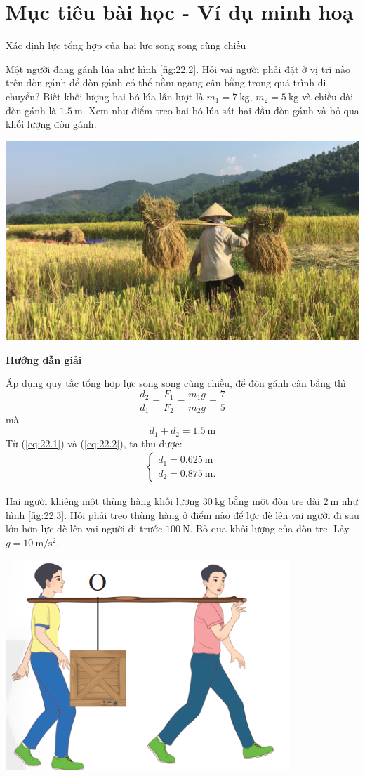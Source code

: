 \section{Mục tiêu bài học - Ví dụ minh hoạ}
\begin{dang}{Xác định lực tổng hợp của hai lực song song cùng chiều}
	{Một người đang gánh lúa như hình \ref{fig:22.2}. Hỏi vai người phải đặt ở vị trí nào trên đòn gánh để đòn gánh có thể nằm ngang cân bằng trong quá trình di chuyển? Biết khối lượng hai bó lúa lần lượt là $m_1=\SI{7}{\kilogram}$, $m_2=\SI{5}{\kilogram}$ và chiều dài đòn gánh là $\SI{1.5}{\meter}$. Xem như điểm treo hai bó lúa sát hai đầu đòn gánh và bỏ qua khối lượng đòn gánh.
	\begin{center}
		\includegraphics[width=0.3\linewidth]{../figs/VN10-2023-PH-TP022-1}
		\label{fig:22.2}
	\end{center}
}
{\begin{center}
		\textbf{Hướng dẫn giải}
	\end{center}
Áp dụng quy tắc tổng hợp lực song song cùng chiều, để đòn gánh cân bằng thì
\begin{equation}
	\label{eq:22.1}
	\dfrac{d_2}{d_1}=\dfrac{F_1}{F_2}=\dfrac{m_1g}{m_2g}=\dfrac{7}{5}
\end{equation}
mà
\begin{equation}
	\label{eq:22.2}
	d_1+d_2=\SI{1.5}{\meter}
\end{equation}
Từ (\ref{eq:22.1}) và (\ref{eq:22.2}), ta thu được:
\begin{align*}
	\begin{cases}
		d_1=\SI{0.625}{\meter}\\
		d_2=\SI{0.875}{\meter}.
	\end{cases}
\end{align*}
}
	{Hai người khiêng một thùng hàng khối lượng $\SI{30}{\kilogram}$ bằng một đòn tre dài $\SI{2}{\meter}$ như hình \ref{fig:22.3}. Hỏi phải treo thùng hàng ở điểm nào để lực đè lên vai người đi sau lớn hơn lực đè lên vai người đi trước $\SI{100}{\newton}$. Bỏ qua khối lượng của đòn tre. Lấy $g=\SI{10}{\meter/\second^2}$.
		\begin{center}
			\includegraphics[width=0.3\linewidth]{../figs/VN10-2023-PH-TP022-3}

\end{center}}
\end{dang}
